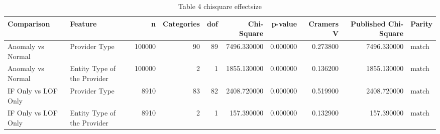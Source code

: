\begin{table}
\caption{Table 4 chisquare effectsize}
\label{tab:table_4_chisquare_effectsize}
\begin{tabular}{llrrrrrrrl}
\toprule
Comparison & Feature & n & Categories & dof & Chi-Square & p-value & Cramers V & Published Chi-Square & Parity \\
\midrule
Anomaly vs Normal & Provider Type & 100000 & 90 & 89 & 7496.330000 & 0.000000 & 0.273800 & 7496.330000 & match \\
Anomaly vs Normal & Entity Type of the Provider & 100000 & 2 & 1 & 1855.130000 & 0.000000 & 0.136200 & 1855.130000 & match \\
IF Only vs LOF Only & Provider Type & 8910 & 83 & 82 & 2408.720000 & 0.000000 & 0.519900 & 2408.720000 & match \\
IF Only vs LOF Only & Entity Type of the Provider & 8910 & 2 & 1 & 157.390000 & 0.000000 & 0.132900 & 157.390000 & match \\
\bottomrule
\end{tabular}
\end{table}
